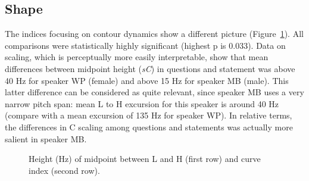 \subsection{Shape}\label{sec233}
The indices focusing on contour dynamics show a different picture (Figure~\ref{fig208}). All comparisons were statistically highly significant (highest p is 0.033). Data on scaling, which is perceptually more easily interpretable, show that mean differences between midpoint height (\textit{sC}) in questions and statement was above 40 Hz for speaker WP (female) and above 15 Hz for speaker MB (male). This latter difference can be considered as quite relevant, since speaker MB uses a very narrow pitch span: mean L to H excursion for this speaker is around 40 Hz (compare with a mean excursion of 135 Hz for speaker WP). In relative terms, the differences in C scaling among questions and statements was actually more salient in speaker MB.

\begin{figure}
\centering
{}
\caption{Height (Hz) of midpoint between L and H (first row) and curve index (second row).}
\label{fig208}\end{figure}

